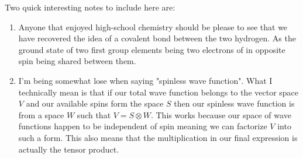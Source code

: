 Two quick interesting notes to include here are:
\begin{enumerate}
\item Anyone that enjoyed high-school chemistry should be please to see that we have recovered the idea of a covalent bond between the two hydrogen.
As the ground state of two first group elements being two electrons of in opposite spin being shared between them.
\item I'm being somewhat lose when saying "spinless wave function". 
What I technically mean is that if our total wave function belongs to the vector space $V$ and our available spins form the space $S$ then our spinless wave function is from a space $W$ such that $V=S\otimes W$.
This works because our space of wave functions happen to be independent of spin meaning we can factorize $V$ into such a form.
This also means that the multiplication in our final expression is actually the tensor product.
\end{enumerate}

